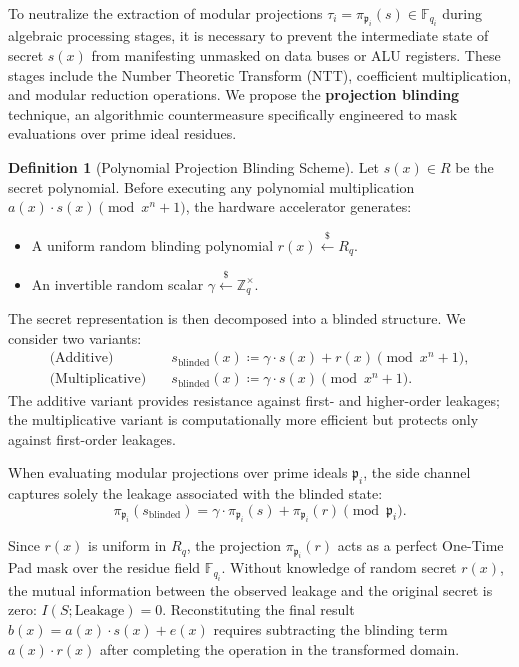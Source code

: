 \documentclass[11pt,a4paper]{article}
\theoremstyle{plain}
\theoremstyle{definition}
\newtheorem{definicion}[teorema]{Definition}
\numberwithin{equation}{section}
\newcommand{\ZZ}{\mathbb{Z}}
\newcommand{\FF}{\mathbb{F}}
\newcommand{\fkp}{\mathfrak{p}}
\begin{document}
To neutralize the extraction of modular projections $\tau_i = \pi_{\fkp_i}(s) \in \FF_{q_i}$ during algebraic processing stages, it is necessary to prevent the intermediate state of secret $s(x)$ from manifesting unmasked on data buses or ALU registers. These stages include the Number Theoretic Transform (NTT), coefficient multiplication, and modular reduction operations. We propose the \textbf{projection blinding} technique, an algorithmic countermeasure specifically engineered to mask evaluations over prime ideal residues.

\begin{definicion}[Polynomial Projection Blinding Scheme]
\label{def:blindaje_proyectivo}
Let $s(x) \in R$ be the secret polynomial. Before executing any polynomial multiplication $a(x) \cdot s(x) \pmod{x^n+1}$, the hardware accelerator generates:
\begin{itemize}
    \item A uniform random blinding polynomial $r(x) \xleftarrow{\$} R_q$.
    \item An invertible random scalar $\gamma \xleftarrow{\$} \ZZ_q^\times$.
\end{itemize}
The secret representation is then decomposed into a blinded structure. We consider two variants:
\begin{align}
\text{(Additive)} \quad & s_{\text{blinded}}(x) \coloneqq \gamma \cdot s(x) + r(x) \pmod{x^n+1}, \label{eq:blinding_aditivo}\\
\text{(Multiplicative)} \quad & s_{\text{blinded}}(x) \coloneqq \gamma \cdot s(x) \pmod{x^n+1}. \label{eq:blinding_multiplicativo}
\end{align}
The additive variant provides resistance against first- and higher-order leakages; the multiplicative variant is computationally more efficient but protects only against first-order leakages.
\end{definicion}

When evaluating modular projections over prime ideals $\fkp_i$, the side channel captures solely the leakage associated with the blinded state:
\begin{equation}
\pi_{\fkp_i}(s_{\text{blinded}}) = \gamma \cdot \pi_{\fkp_i}(s) + \pi_{\fkp_i}(r) \pmod{\fkp_i}.
\end{equation}

Since $r(x)$ is uniform in $R_q$, the projection $\pi_{\fkp_i}(r)$ acts as a perfect One-Time Pad mask over the residue field $\FF_{q_i}$. Without knowledge of random secret $r(x)$, the mutual information between the observed leakage and the original secret is zero: $I(S; \text{Leakage}) = 0$. Reconstituting the final result $b(x) = a(x) \cdot s(x) + e(x)$ requires subtracting the blinding term $a(x) \cdot r(x)$ after completing the operation in the transformed domain.
\end{document}
